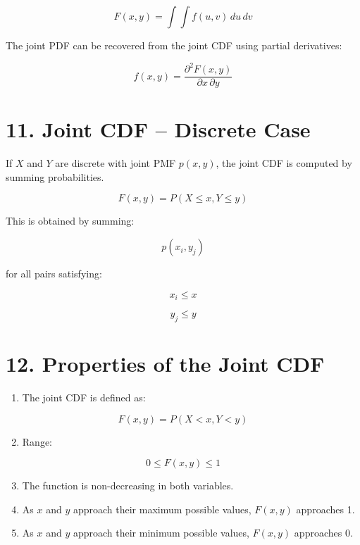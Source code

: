 \documentclass{article}
\begin{document}
\[
F(x, y) = \int\int f(u, v) \, du \, dv
\]

The joint PDF can be recovered from the joint CDF using partial derivatives:

\[
f(x, y) = \frac{\partial^{2}F(x, y)}{\partial x \, \partial y}
\]

\bigskip

\section*{11. Joint CDF – Discrete Case}

If $X$ and $Y$ are discrete with joint PMF $p(x, y)$, the joint CDF is computed by summing probabilities.

\[
F(x, y) = P(X \leq x, Y \leq y)
\]

This is obtained by summing:

\[
p(x_i, y_j)
\]

for all pairs satisfying:

\[
x_i \leq x
\]

\[
y_j \leq y
\]

\bigskip

\section*{12. Properties of the Joint CDF}

\begin{enumerate}
\item The joint CDF is defined as:
\end{enumerate}

\[
F(x, y) = P(X < x, Y < y)
\]

\begin{enumerate}
\setcounter{enumi}{1}
\item Range:
\end{enumerate}

\[
0 \leq F(x, y) \leq 1
\]

\begin{enumerate}
\setcounter{enumi}{2}
\item The function is non-decreasing in both variables.
\item As $x$ and $y$ approach their maximum possible values, $F(x,y)$ approaches 1.
\item As $x$ and $y$ approach their minimum possible values, $F(x,y)$ approaches 0.
\end{enumerate}

\bigskip
\end{document}
